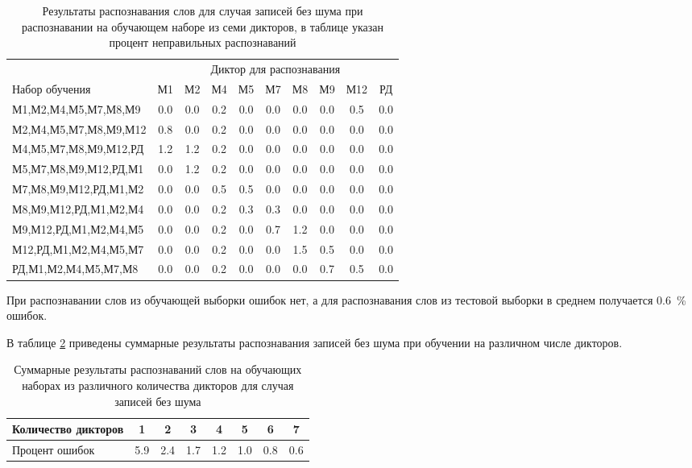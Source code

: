 \begin{table}[h]
	\centering
	\caption{Результаты распознавания слов для случая записей без шума при распознавании на обучающем наборе из семи дикторов, в таблице указан процент неправильных распознаваний}
	\label{tab:cnn_without_noise}
	\begin{tabular}{| l | c | c | c | c | c | c | c | c | c |}
		\hline
		 & \multicolumn{9}{c|}{Диктор для распознавания} \\
		\hhline{----------}
		Набор обучения \phantom{0000000000000} & М1  & М2  & М4  & М5  & М7  & М8  & М9  & М12 & РД \\
		\hline
		М1,М2,М4,М5,М7,М8,М9  & 0.0 & 0.0 & 0.2 & 0.0 & 0.0 & 0.0 & 0.0 & 0.5 & 0.0 \\
		М2,М4,М5,М7,М8,М9,М12 & 0.8 & 0.0 & 0.2 & 0.0 & 0.0 & 0.0 & 0.0 & 0.0 & 0.0 \\
		М4,М5,М7,М8,М9,М12,РД & 1.2 & 1.2 & 0.2 & 0.0 & 0.0 & 0.0 & 0.0 & 0.0 & 0.0 \\
		М5,М7,М8,М9,М12,РД,М1 & 0.0 & 1.2 & 0.2 & 0.0 & 0.0 & 0.0 & 0.0 & 0.0 & 0.0 \\
		М7,М8,М9,М12,РД,М1,М2 & 0.0 & 0.0 & 0.5 & 0.5 & 0.0 & 0.0 & 0.0 & 0.0 & 0.0 \\
		М8,М9,М12,РД,М1,М2,М4 & 0.0 & 0.0 & 0.2 & 0.3 & 0.3 & 0.0 & 0.0 & 0.0 & 0.0 \\
		М9,М12,РД,М1,М2,М4,М5 & 0.0 & 0.0 & 0.2 & 0.0 & 0.7 & 1.2 & 0.0 & 0.0 & 0.0 \\
		М12,РД,М1,М2,М4,М5,М7 & 0.0 & 0.0 & 0.2 & 0.0 & 0.0 & 1.5 & 0.5 & 0.0 & 0.0 \\
		РД,М1,М2,М4,М5,М7,М8  & 0.0 & 0.0 & 0.2 & 0.0 & 0.0 & 0.0 & 0.7 & 0.5 & 0.0 \\
		\hline
	\end{tabular}
\end{table}

При распознавании слов из обучающей выборки ошибок нет, а для распознавания слов из тестовой выборки в среднем получается 0.6~\% ошибок.

В таблице \ref{tab:cnn_without_noise_summary} приведены суммарные результаты распознавания записей без шума при обучении на различном числе дикторов.

\begin{table}[h]
	\centering
	\caption{Суммарные результаты распознаваний слов на обучающих наборах из различного количества дикторов для случая записей без шума}
	\label{tab:cnn_without_noise_summary}
	\begin{tabular}{| l | c | c | c | c | c | c | c |}
		\hline
		Количество дикторов	\phantom{000} & \phantom{00}1\phantom{00} & \phantom{00}2\phantom{00} & \phantom{00}3\phantom{00} & \phantom{00}4\phantom{00} & \phantom{00}5\phantom{00} & \phantom{00}6\phantom{00} & \phantom{00}7\phantom{00} \\
		\hline
		Процент ошибок		& 5.9 & 2.4 & 1.7 & 1.2 & 1.0 & 0.8 & 0.6 \\
		\hline
	\end{tabular}
\end{table}


